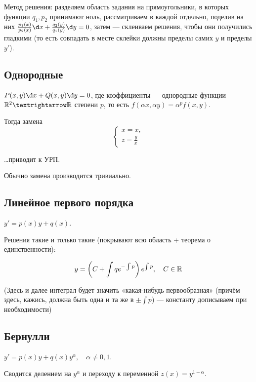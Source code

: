\documentclass[12pt, a4paper]{article}
\begin{document}
Метод решения: разделяем область задания на прямоугольники, в которых функции $q_1, p_2$ принимают ноль,
рассматриваем в каждой отдельно, поделив на них $\frac{p_1(x)}{ p_2(x)} \d x + \frac{q_2(y)}{q_1(y)} \d y = 0$,
затем — склеиваем решения, чтобы они получились гладкими (то есть совпадать в месте склейки должны пределы самих $y$ и пределы $y'$).

\subsection{Однородные}

$P(x, y) \d x + Q(x, y) \d y = 0$, где коэффициенты — однородные функции $\sR^2 → \sR$ степени $p$, то есть $f(\alpha x, \alpha y) = \alpha^p f(x, y)$.

Тогда замена
\begin{equation}
    \begin{cases}
        x = x, \\
        z = \frac{y}{x}
    \end{cases}
\end{equation}

…приводит к УРП.

Обычно замена производится тривиально.

\subsection{Линейное первого порядка}

$y' = p(x)y + q(x)$.

Решения такие и только такие (покрывают всю область + теорема о единственности):

\begin{equation}
    y = \left(C + \int q e^{-\int p} \right) e^{\int p}, \quad C \in {\mathbb{R}}
\end{equation}

(Здесь и далее интеграл будет значить «какая-нибудь первообразная» 
(причём здесь, кажись, должна быть одна и та же в $±\int p$) 
— константу дописываем при необходимости)

\subsection{Бернулли}

$y' = p(x)y + q(x)y^{\alpha}, \quad \alpha ≠ 0, 1$.

Сводится делением на $y^{\alpha}$ и переходу к переменной $z(x) = y^{1 - \alpha}$.
\end{document}
